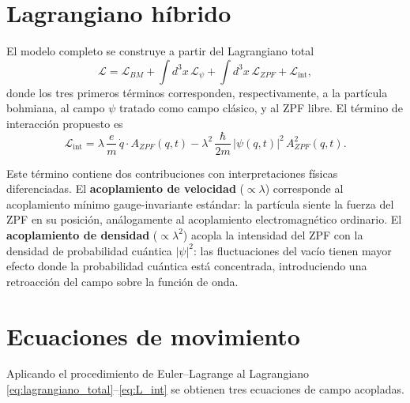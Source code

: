 \documentclass[11pt,a4paper]{article}
\begin{document}
\section{Lagrangiano híbrido}
\label{sec:lagrangiano}

El modelo completo se construye a partir del Lagrangiano total
\begin{equation}
\mathcal{L} = \mathcal{L}_{BM} + \int d^3x\,\mathcal{L}_\psi
+ \int d^3x\,\mathcal{L}_{ZPF} + \mathcal{L}_\text{int},
\label{eq:lagrangiano_total}
\end{equation}
donde los tres primeros términos corresponden, respectivamente, a la
partícula bohmiana, al campo $\psi$ tratado como campo clásico, y al ZPF
libre. El término de interacción propuesto es
\begin{equation}
\mathcal{L}_\text{int} = \lambda\,\frac{e}{m}\,\dot{q}\cdot A_{ZPF}(q,t)
- \lambda^2\,\frac{\hbar}{2m}\,|\psi(q,t)|^2\,A^2_{ZPF}(q,t).
\label{eq:L_int}
\end{equation}
\begin{sloppypar}
Este término contiene dos contribuciones con interpretaciones físicas
diferenciadas. El \textbf{acoplamiento de velocidad} ($\propto\lambda$)
corresponde al acoplamiento mínimo gauge-invariante estándar: la
partícula siente la fuerza del ZPF en su posición, análogamente al
acoplamiento electromagnético ordinario. El \textbf{acoplamiento de
densidad} ($\propto\lambda^2$) acopla la intensidad del ZPF con la
densidad de probabilidad cuántica $|\psi|^2$: las fluctuaciones del
vacío tienen mayor efecto donde la probabilidad cuántica está
concentrada, introduciendo una retroacción del campo sobre la función
de onda.
\end{sloppypar}

\section{Ecuaciones de movimiento}
\label{sec:ecuaciones}

Aplicando el procedimiento de Euler--Lagrange al Lagrangiano
\eqref{eq:lagrangiano_total}--\eqref{eq:L_int} se obtienen tres
ecuaciones de campo acopladas.
\end{document}

